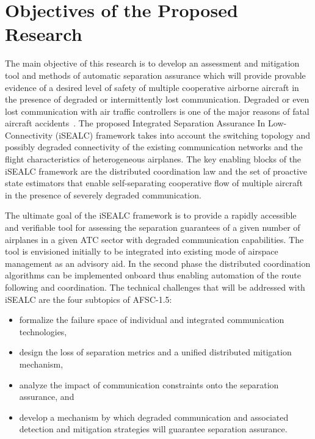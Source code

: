 \documentclass[letter,onecolumn,12pt]{aiaa-tc}
\newcommand{\1}{1_n}
\begin{document}
\section{Objectives of the Proposed Research}

The main objective of this research is to develop an assessment and mitigation tool and methods of automatic separation assurance which will provide provable evidence of a desired level of safety of multiple cooperative airborne aircraft in the presence of degraded or intermittently lost communication. Degraded or even lost communication with air traffic controllers is one of the major reasons of fatal aircraft accidents~\cite{Kochenderfer_2012}. The proposed  Integrated Separation Assurance In Low-Connectivity (iSEALC) framework takes into account the switching topology and possibly degraded connectivity of the existing communication networks and the flight characteristics of heterogeneous airplanes. The key enabling blocks of the iSEALC framework are the distributed coordination law and the set of proactive state estimators that enable self-separating cooperative flow of multiple aircraft in the presence of severely degraded communication.

The ultimate goal of the iSEALC framework is to provide a rapidly accessible and verifiable tool for assessing the separation guarantees of a given number of airplanes in a given ATC sector with degraded communication capabilities.  The tool is  envisioned initially to be integrated into existing mode of airspace management as an advisory aid. In the second phase the distributed coordination algorithms can be implemented onboard thus enabling automation of the route following and coordination. The technical challenges that will be addressed with iSEALC are the four subtopics of AFSC-1.5:
\vspace{-2mm}
\begin{itemize}
\setlength{\itemsep}{-4pt}
    \item formalize the failure space of individual and integrated communication technologies,
    \item design the loss of separation metrics and a unified distributed mitigation mechanism,
    \item analyze the impact of  communication constraints onto the separation assurance, and
    \item develop a mechanism by which degraded communication and associated detection and mitigation strategies will guarantee separation assurance.
\end{itemize}
\vspace{-2mm}
\end{document}
